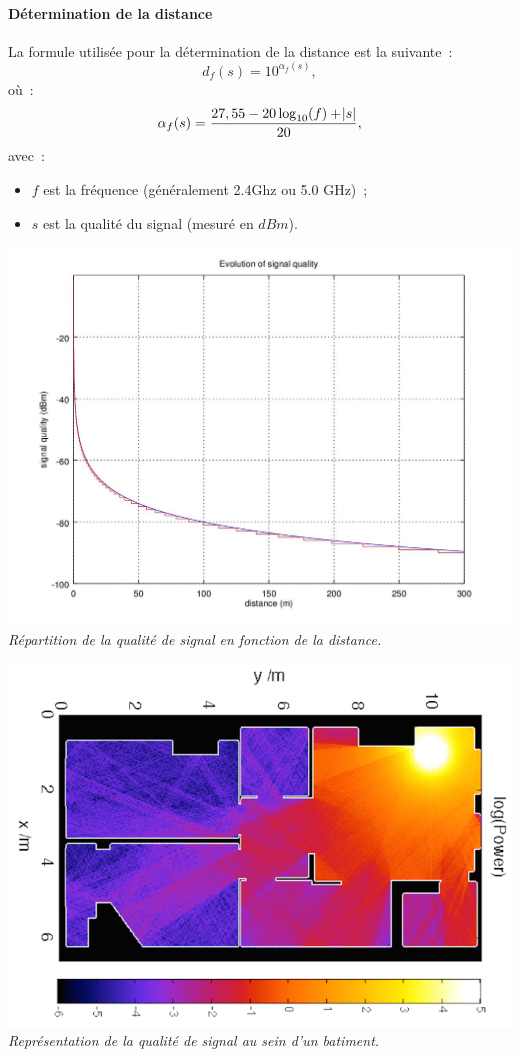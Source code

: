 \documentclass[11pt,a4paper]{article}
\begin{document}
    \paragraph{Détermination de la distance}
      La formule utilisée pour la détermination de la distance est la suivante~:
      \[d_f(s) = 10^{\alpha_f(s)},\]
	  où~:
	  \[\alpha_f(s) = \frac{27,55-20\log_{10}(f)+\abs s}{20},\]
      avec~:
	  \begin{itemize}
      \item[] $f$ est la fréquence (généralement 2.4Ghz ou 5.0 GHz)~;
      \item[] $s$ est la qualité du signal (mesuré en $dBm$).
    \end{itemize}
    \begin{center}
      \includegraphics[scale=0.5]{signal-propagation.jpg}\\
      \textit{Répartition de la qualité de signal en fonction de la distance.}
    \end{center}
    \begin{center}
      \includegraphics[scale=0.4]{wifi-propagation.png}\\
      \textit{Représentation de la qualité de signal au sein d'un batiment.}
    \end{center}
\end{document}
